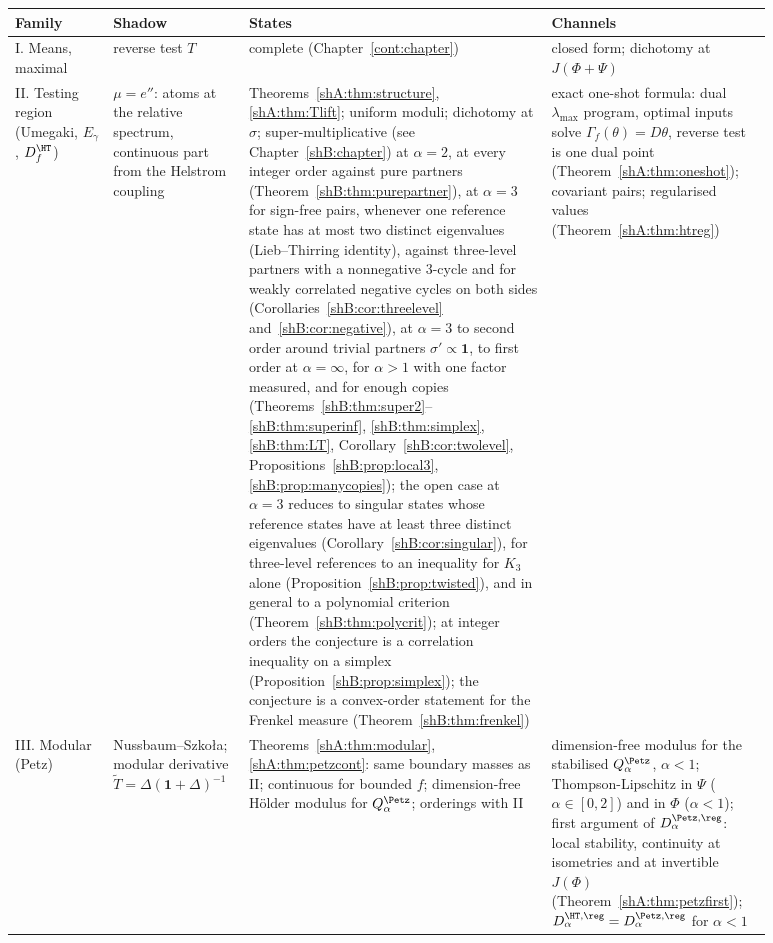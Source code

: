 {\footnotesize
\begin{longtable}{>{\raggedright\arraybackslash}p{0.12\linewidth}>{\raggedright\arraybackslash}p{0.14\linewidth}>{\raggedright\arraybackslash}p{0.37\linewidth}>{\raggedright\arraybackslash}p{0.25\linewidth}}
\toprule
Family & Shadow & States & Channels\\
\midrule
\endhead
\bottomrule
\endlastfoot
I. Means, maximal & reverse test $T$ & complete (Chapter~\ref{cont:chapter}) & closed form; dichotomy at $J(\Phi+\Psi)$\\
II. Testing region (Umegaki, $E_\gamma$, $D^\HT_f$) & $\mu=e''$: atoms at the relative spectrum, continuous part from the Helstrom coupling & Theorems~\ref{shA:thm:structure}, \ref{shA:thm:Tlift}; uniform moduli; dichotomy at $\sigma$; super-multiplicative (see Chapter~\ref{shB:chapter}) at $\alpha=2$, at every integer order against pure partners (Theorem~\ref{shB:thm:purepartner}), at $\alpha=3$ for sign-free pairs, whenever one reference state has at most two distinct eigenvalues (Lieb--Thirring identity), against three-level partners with a nonnegative $3$-cycle and for weakly correlated negative cycles on both sides (Corollaries~\ref{shB:cor:threelevel} and~\ref{shB:cor:negative}), at $\alpha=3$ to second order around trivial partners $\sigma'\propto\mathbf 1$, to first order at $\alpha=\infty$, for $\alpha>1$ with one factor measured, and for enough copies (Theorems~\ref{shB:thm:super2}--\ref{shB:thm:superinf}, \ref{shB:thm:simplex}, \ref{shB:thm:LT}, Corollary~\ref{shB:cor:twolevel}, Propositions~\ref{shB:prop:local3}, \ref{shB:prop:manycopies}); the open case at $\alpha=3$ reduces to singular states whose reference states have at least three distinct eigenvalues (Corollary~\ref{shB:cor:singular}), for three-level references to an inequality for $K_3$ alone (Proposition~\ref{shB:prop:twisted}), and in general to a polynomial criterion (Theorem~\ref{shB:thm:polycrit}); at integer orders the conjecture is a correlation inequality on a simplex (Proposition~\ref{shB:prop:simplex}); the conjecture is a convex-order statement for the Frenkel measure (Theorem~\ref{shB:thm:frenkel}) & exact one-shot formula: dual $\lambda_{\max}$ program, optimal inputs solve $\Gamma_f(\theta)=D\theta$, reverse test is one dual point (Theorem~\ref{shA:thm:oneshot}); covariant pairs; regularised values (Theorem~\ref{shA:thm:htreg})\\
III. Modular (Petz) & Nussbaum--Szko{\l}a; modular derivative $\widetilde T=\Delta(\mathbf 1+\Delta)^{-1}$ & Theorems~\ref{shA:thm:modular}, \ref{shA:thm:petzcont}: same boundary masses as II; continuous for bounded $f$; dimension-free Hölder modulus for $Q^\Petz_\alpha$; orderings with II & dimension-free modulus for the stabilised $Q^\Petz_\alpha$, $\alpha<1$; Thompson-Lipschitz in $\Psi$ ($\alpha\in[0,2]$) and in $\Phi$ ($\alpha<1$); first argument of $D^{\Petz,\reg}_\alpha$: local stability, continuity at isometries and at invertible $J(\Phi)$ (Theorem~\ref{shA:thm:petzfirst}); $D^{\HT,\reg}_\alpha=D^{\Petz,\reg}_\alpha$ for $\alpha<1$\\

\end{longtable}}
